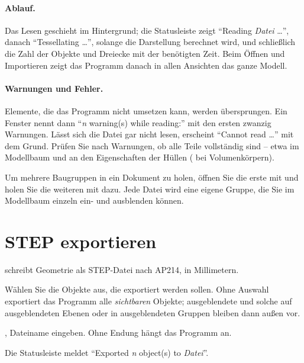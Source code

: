 \paragraph{Ablauf.} Das Lesen geschieht im Hintergrund; die Statusleiste zeigt
\enquote{Reading \textit{Datei} \dots}, danach \enquote{Tessellating \dots}, solange die
Darstellung berechnet wird, und schließlich die Zahl der Objekte und Dreiecke mit der
benötigten Zeit. Beim Öffnen und Importieren zeigt das Programm danach in allen Ansichten das
ganze Modell.

\paragraph{Warnungen und Fehler.} Elemente, die das Programm nicht umsetzen kann, werden
übersprungen. Ein Fenster nennt dann \enquote{\textit{n} warning(s) while reading:} mit den
ersten zwanzig Warnungen. Lässt sich die Datei gar nicht lesen, erscheint \enquote{Cannot read
\dots} mit dem Grund. Prüfen Sie nach Warnungen, ob alle Teile vollständig sind -- etwa im
Modellbaum und an den Eigenschaften der Hüllen ( bei Volumenkörpern).

\begin{tipp}
Um mehrere Baugruppen in ein Dokument zu holen, öffnen Sie die erste mit  und
holen Sie die weiteren mit  dazu. Jede Datei wird eine eigene Gruppe, die
Sie im Modellbaum einzeln ein- und ausblenden können.
\end{tipp}

\section{STEP exportieren}\label{sec:step-export}

 schreibt Geometrie als STEP-Datei nach AP214, in Millimetern.

\begin{schritte}
  \item Wählen Sie die Objekte aus, die exportiert werden sollen. Ohne Auswahl exportiert das
    Programm alle \emph{sichtbaren} Objekte; ausgeblendete und solche auf ausgeblendeten
    Ebenen oder in ausgeblendeten Gruppen bleiben dann außen vor.
  \item {}, Dateiname eingeben. Ohne Endung hängt das Programm
     an.
  \item Die Statusleiste meldet \enquote{Exported \textit{n} object(s) to \textit{Datei}}.
\end{schritte}

